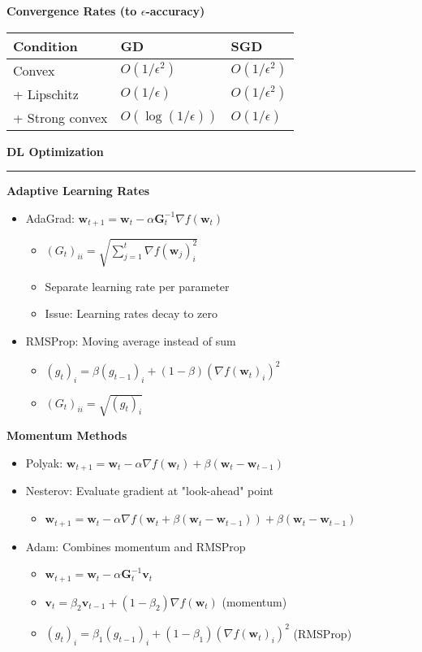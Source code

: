 \documentclass[8pt,letter,landscape]{article}
\newcommand{\sectiontitle}[1]{\textbf{\large #1}\vspace{0.2em}\hrule\vspace{0.5em}}
\begin{document}
\begin{multicols*}{3}
\textbf{Convergence Rates (to $\epsilon$-accuracy)}

\begin{tabular}{lll}
Condition & GD & SGD \\
\hline
Convex & $O(1/\epsilon^2)$ & $O(1/\epsilon^2)$ \\
+ Lipschitz & $O(1/\epsilon)$ & $O(1/\epsilon^2)$ \\
+ Strong convex & $O(\log(1/\epsilon))$ & $O(1/\epsilon)$
\end{tabular}

\sectiontitle{DL Optimization}

\textbf{Adaptive Learning Rates}
\begin{itemize}[leftmargin=*,noitemsep,topsep=0pt]
\item AdaGrad: $\mathbf{w}_{t+1} = \mathbf{w}_t - \alpha\mathbf{G}_t^{-1}\nabla f(\mathbf{w}_t)$
    \begin{itemize}[leftmargin=*,nosep]
        \item $(G_t)_{ii} = \sqrt{\sum_{j=1}^t \nabla f(\mathbf{w}_j)_i^2}$
        \item Separate learning rate per parameter
        \item Issue: Learning rates decay to zero
    \end{itemize}
\item RMSProp: Moving average instead of sum
    \begin{itemize}[leftmargin=*,nosep]
        \item $(g_t)_i = \beta(g_{t-1})_i + (1-\beta)(\nabla f(\mathbf{w}_t)_i)^2$
        \item $(G_t)_{ii} = \sqrt{(g_t)_i}$
    \end{itemize}
\end{itemize}

\textbf{Momentum Methods}
\begin{itemize}[leftmargin=*,noitemsep,topsep=0pt]
\item Polyak: $\mathbf{w}_{t+1} = \mathbf{w}_t - \alpha\nabla f(\mathbf{w}_t) + \beta(\mathbf{w}_t - \mathbf{w}_{t-1})$
\item Nesterov: Evaluate gradient at "look-ahead" point
    \begin{itemize}[leftmargin=*,nosep]
        \item $\mathbf{w}_{t+1} = \mathbf{w}_t - \alpha\nabla f(\mathbf{w}_t + \beta(\mathbf{w}_t - \mathbf{w}_{t-1})) + \beta(\mathbf{w}_t - \mathbf{w}_{t-1})$
    \end{itemize}
    \item Adam: Combines momentum and RMSProp
    \begin{itemize}[leftmargin=*,nosep]
        \item $\mathbf{w}_{t+1} = \mathbf{w}_t - \alpha\mathbf{G}_t^{-1}\mathbf{v}_t$
        \item $\mathbf{v}_t = \beta_2\mathbf{v}_{t-1} + (1-\beta_2)\nabla f(\mathbf{w}_t)$ (momentum)
        \item $(g_t)_i = \beta_1(g_{t-1})_i + (1-\beta_1)(\nabla f(\mathbf{w}_t)_i)^2$ (RMSProp)
    \end{itemize}
\end{itemize}


\end{multicols*}
\end{document}
